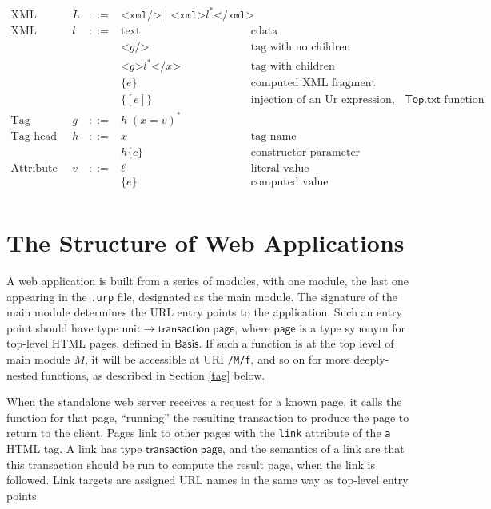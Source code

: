 \documentclass{article}
\newcommand{\mt}[1]{\mathsf{#1}}
\begin{document}
$$\begin{array}{rrcll}
  \textrm{XML fragments} & L &::=& \texttt{<xml/>} \mid \texttt{<xml>}l^*\texttt{</xml>} \\
  \textrm{XML pieces} & l &::=& \textrm{text} & \textrm{cdata} \\
  &&& \texttt{<}g\texttt{/>} & \textrm{tag with no children} \\
  &&& \texttt{<}g\texttt{>}l^*\texttt{</}x\texttt{>} & \textrm{tag with children} \\
  &&& \{e\} & \textrm{computed XML fragment} \\
  &&& \{[e]\} & \textrm{injection of an Ur expression, via the $\mt{Top}.\mt{txt}$ function} \\
  \textrm{Tag} & g &::=& h \; (x = v)^* \\
  \textrm{Tag head} & h &::=& x & \textrm{tag name} \\
  &&& h\{c\} & \textrm{constructor parameter} \\
  \textrm{Attribute value} & v &::=& \ell & \textrm{literal value} \\
  &&& \{e\} & \textrm{computed value} \\
\end{array}$$


\section{The Structure of Web Applications}

A web application is built from a series of modules, with one module, the last one appearing in the \texttt{.urp} file, designated as the main module.  The signature of the main module determines the URL entry points to the application.  Such an entry point should have type $\mt{unit} \to \mt{transaction} \; \mt{page}$, where $\mt{page}$ is a type synonym for top-level HTML pages, defined in $\mt{Basis}$.  If such a function is at the top level of main module $M$, it will be accessible at URI \texttt{/M/f}, and so on for more deeply-nested functions, as described in Section \ref{tag} below.

When the standalone web server receives a request for a known page, it calls the function for that page, ``running'' the resulting transaction to produce the page to return to the client.  Pages link to other pages with the \texttt{link} attribute of the \texttt{a} HTML tag.  A link has type $\mt{transaction} \; \mt{page}$, and the semantics of a link are that this transaction should be run to compute the result page, when the link is followed.  Link targets are assigned URL names in the same way as top-level entry points.
\end{document}

